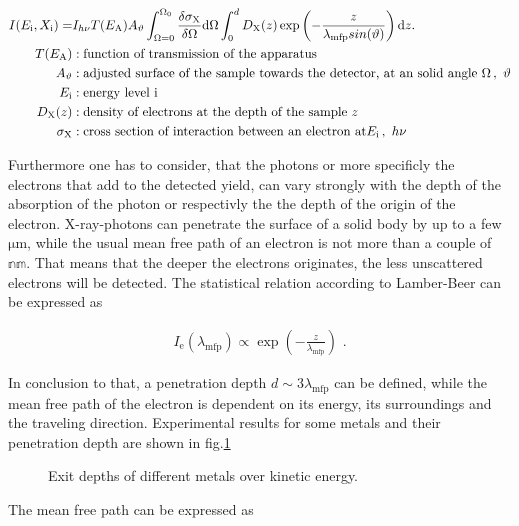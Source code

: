 \documentclass[numbers=noenddot,a4paper]{article}
\newcommand{\diff}{\textnormal{d}}
\newcommand{\ix}[1]{_\text{#1}}
\begin{document}
	\begin{align}
	I(E\ix{i},X\ix{i})=&I_{h\nu}T(E\ix{A})A_{\vartheta}\int_{\Omega=0}^{\Omega\ix{0}}\frac{\delta\sigma\ix{X}}{\delta\Omega}\diff \Omega\int_{0}^{d}D\ix{X}(z)\exp\left(-\frac{z}{\lambda\ix{mfp}sin(\vartheta)}\right)\diff z. \label{eq:intens} \\
	T(E\ix{A})&: \text{function of transmission of the apparatus} \nonumber\\
	A_{\vartheta}&: \text{adjusted surface of the sample towards the detector, at an solid angle } \Omega\, ,\,\,\vartheta \nonumber\\
	E\ix{i}&: \text{energy level i} \nonumber\\
	D\ix{X}(z)&: \text{density of electrons at the depth of the sample } z \nonumber\\
	\sigma\ix{X}&: \text{cross section of interaction between an electron at} E\ix{i}\, ,\,\, h\nu \nonumber
	\end{align}

Furthermore one has to consider, that the photons or more specificly the electrons that add to the detected yield, can vary strongly with the depth of the absorption of the photon or respectivly the the depth of the origin of the electron. X-ray-photons can penetrate the surface of a solid body by up to a few $\mathrm{\mu m}$, while the usual mean free path of an electron is  not more than a couple of $\mathbb{nm}$. That means that the deeper the electrons originates, the less unscattered electrons will be detected. The statistical relation according to  Lamber-Beer can be expressed as

	\begin{align}
	I\ix{e}(\lambda\ix{mfp})\propto\exp\left(-\frac{z}{\lambda\ix{mfp}}\right)\,\, .\label{eq:weg}
	\end{align}

In conclusion to that, a penetration depth $d \sim 3\lambda_\mathrm{mfp}$ can be defined, while the mean free path of the electron is dependent on its energy, its surroundings and the traveling direction. Experimental results for some metals and their penetration depth are shown in fig.\ref{fig:depth}

				\begin{figure}[h]
					\centering
					\caption{Exit depths of different metals over kinetic energy.\cite{XPSalt}}\label{fig:depth}
				\end{figure}
The mean free path can be expressed as
\end{document}
